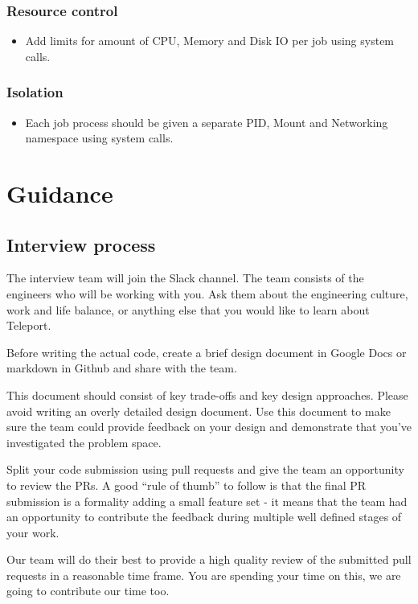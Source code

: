 \documentclass{article}
\begin{document}
  \subsubsection*{Resource control}
  \begin{itemize}
  \item[] Add limits for amount of CPU, Memory and Disk IO per job using system calls.
  \end{itemize}

  \subsubsection*{Isolation}
  \begin{itemize}
  \item[] Each job process should be given a separate PID, Mount and Networking namespace using system calls.
  \end{itemize}

\section{Guidance}

\subsection{Interview process}

The interview team will join the Slack channel. The team consists of the engineers who will be working with you.
Ask them about the engineering culture, work and life balance, or anything else that you would like to learn about Teleport.

Before writing the actual code, create a brief design document in Google Docs or markdown in Github and share with the team.

This document should consist of key trade-offs and key design approaches. Please avoid writing an overly detailed design document. Use this document to make sure the team could provide feedback on your design and demonstrate that you've investigated the problem space.

Split your code submission using pull requests and give the team an opportunity to review the PRs. A good “rule of thumb” to follow is that the final PR submission is a formality adding a small feature set - it means that the team had an opportunity to contribute the feedback during multiple well defined stages of your work.

Our team will do their best to provide a high quality review of the submitted pull requests in a reasonable time frame. You are spending your time on this, we are going to contribute our time too.
\end{document}
